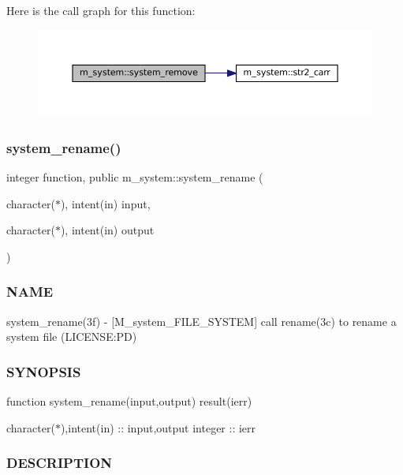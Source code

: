 Here is the call graph for this function\+:\nopagebreak
\begin{figure}[H]
\begin{center}
\leavevmode
\includegraphics[width=350pt]{namespacem__system_a7fa10b991ae066609b687423918cff52_cgraph}
\end{center}
\end{figure}
\mbox{\label{namespacem__system_adfbaf3d17790da9ba0c520683d5b8003}} 
\subsubsection{\texorpdfstring{system\+\_\+rename()}{system\_rename()}}
{\footnotesize\ttfamily integer function, public m\+\_\+system\+::system\+\_\+rename (\begin{DoxyParamCaption}\item[{character($\ast$), intent(in)}]{input,  }\item[{character($\ast$), intent(in)}]{output }\end{DoxyParamCaption})}



\subsubsection*{N\+A\+ME}

system\+\_\+rename(3f) -\/ \mbox{[}M\+\_\+system\+\_\+\+F\+I\+L\+E\+\_\+\+S\+Y\+S\+T\+EM\mbox{]} call rename(3c) to rename a system file (L\+I\+C\+E\+N\+SE\+:PD) \subsubsection*{S\+Y\+N\+O\+P\+S\+IS}

function system\+\_\+rename(input,output) result(ierr)

character($\ast$),intent(in) \+:\+: input,output integer \+:\+: ierr \subsubsection*{D\+E\+S\+C\+R\+I\+P\+T\+I\+ON}

